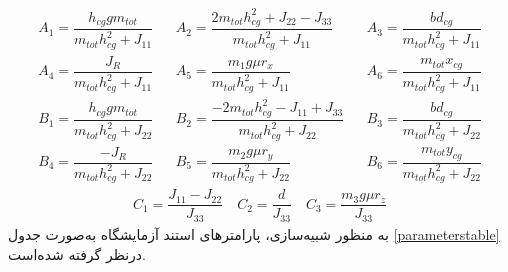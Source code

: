 \begin{align*}
	&A_1  = \dfrac{h_{cg}gm_{tot}}{m_{tot}h_{cg}^2+J_{11}}& 
	&A_2  =  \dfrac{2m_{tot}h_{cg}^2+J_{22}-J_{33}}{m_{tot}h_{cg}^2+J_{11}}& 
	&A_3  =  \dfrac{bd_{cg}}{m_{tot}h_{cg}^2+J_{11}}& 	\\
	& A_4  =  \dfrac{J_R}{m_{tot}h_{cg}^2+J_{11}} & 
	& A_5 =  \dfrac{m_1g\mu r_x}{m_{tot}h_{cg}^2 + J_{11}} & 
	& A_6= \dfrac{m_{tot}x_{cg}}{m_{tot}h_{cg}^2+J_{11}} \\
	&B_1  =  \dfrac{h_{cg}gm_{tot}}{m_{tot}h_{cg}^2+J_{22}}& 
	&B_2 =  \dfrac{-2m_{tot}h_{cg}^2-J_{11}+J_{33}}{m_{tot}h_{cg}^2+J_{22}}& 
	&B_3  =  \dfrac{bd_{cg}}{m_{tot}h_{cg}^2+J_{22}}& \\
	&B_4 =  \dfrac{-J_R}{m_{tot}h_{cg}^2+J_{22}}& 
	& B_5 =  \dfrac{m_2g\mu r_y}{m_{tot}h_{cg}^2 + J_{22}}& 
	& B_6= \dfrac{m_{tot}y_{cg}}{m_{tot}h_{cg}^2+J_{22}} 
\end{align*}
\begin{align*}
	C_1 =\dfrac{J_{11}-J_{22}}{J_{33}}\quad
	C_2 =\dfrac{d}{J_{33}}\quad
	C_3 = \dfrac{m_3g\mu r_z}{ J_{33}}
\end{align*}
به منظور شبیه‌سازی، پارامترهای استند آزمایشگاه به‌صورت جدول 
\ref{parameterstable}
درنظر گرفته شده‌است.
